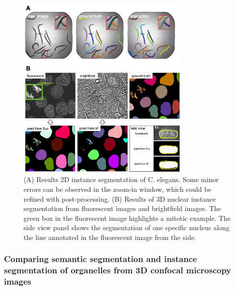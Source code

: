 \begin{figure}
\hypertarget{fig:instance}{%
\centering
\includegraphics[width=0.75\textwidth,height=\textheight]{images/embedseg.png}
\caption{(A) Results 2D instance segmentation of C. elegans. Some minor errors can be observed in the zoom-in window, which could be refined with post-processing. (B) Results of 3D nuclear instance segmentation from fluorescent images and brightfield images. The green box in the fluorescent image highlights a mitotic example. The side view panel shows the segmentation of one specific nucleus along the line annotated in the fluorescent image from the side.}\label{fig:instance}
}
\end{figure}

\hypertarget{comparing-semantic-segmentation-and-instance-segmentation-of-organelles-from-3d-confocal-microscopy-images}{%
\subsubsection{Comparing semantic segmentation and instance segmentation of organelles from 3D confocal microscopy images}\label{comparing-semantic-segmentation-and-instance-segmentation-of-organelles-from-3d-confocal-microscopy-images}}

